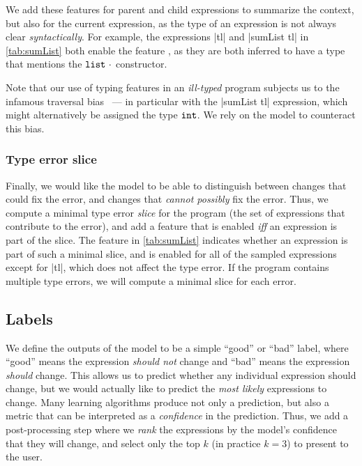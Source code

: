 We add these features for parent and child expressions to summarize the
context, but also for the current expression, as the type of an
expression is not always clear \emph{syntactically}.
%
For example, the expressions |tl| and |sumList tl|
in \autoref{tab:sumList} both enable the feature \HasTypeList, as they
are both inferred to have a type that mentions the $\mathtt{list}\ \cdot$
constructor.

Note that our use of typing features in an \emph{ill-typed} program
subjects us to the infamous traversal
bias~\cite{McAdam1998-ub,Yang2000-yr} --- in particular with the
|sumList tl| expression, which might alternatively be assigned
the type $\mathtt{int}$.
%
We rely on the model to counteract this bias.

\subsubsection{Type error slice}
Finally, we would like the model to be able to distinguish between
changes that could fix the error, and changes that
\emph{cannot possibly} fix the error.
%
Thus, we compute a minimal type error \emph{slice} for the program
(\ie the set of expressions that contribute to the error), and add a
feature that is enabled \emph{iff} an expression is part of the slice.
%
The \InSlice feature in \autoref{tab:sumList} indicates whether an
expression is part of such a minimal slice, and is enabled for all of
the sampled expressions except for |tl|, which does not affect
the type error.
%
If the program contains multiple type errors, we will compute
a minimal slice for each error.

\subsection{Labels}
\label{sec:labels}
We define the outputs of the model to be a simple ``good'' or ``bad''
label, where ``good'' means the expression \emph{should not} change and
``bad'' means the expression \emph{should} change.
%
This allows us to predict whether any individual expression should
change, but we would actually like to predict the \emph{most likely}
expressions to change.
%
Many learning algorithms produce not only a prediction, but also a
metric that can be interpreted as a \emph{confidence} in the prediction.
%
Thus, we add a post-processing step where we \emph{rank} the expressions
by the model's confidence that they will change, and select only the top
$k$ (in practice $k=3$) to present to the user.

